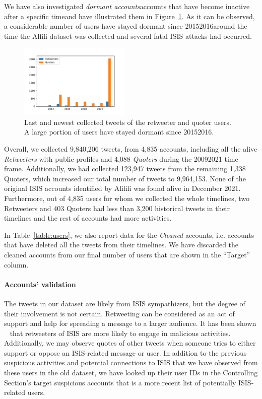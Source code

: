 \documentclass[letterpaper]{article} %
\begin{document}
We have also investigated \textit{dormant accounts}accounts that have become inactive after a specific timeand have illustrated them in Figure~\ref{fig:last-activity}. As it can be observed, a considerable  number  of  users  have stayed dormant since 20152016around the time the Alfifi dataset was collected and several fatal ISIS attacks had occurred.

\begin{figure}[htbp]
\includegraphics[width=0.47\textwidth]{img/newest-activity.pdf}
\caption{Last and newest collected tweets of the retweeter and quoter users. A large portion of users have stayed dormant since 20152016.}
\label{fig:last-activity}
\end{figure}


Overall, we collected 9,840,206 tweets, from 4,835 accounts, including all the alive \textit{Retweeters} with public profiles and 4,088 \textit{Quoters} during the 20092021 time frame. Additionally, we had collected 123,947 tweets from the remaining 1,338 Quoters, which increased our total number of tweets to 9,964,153. None of the original ISIS accounts identified by Alififi \cite{alfifi2018measuring} was found alive in December 2021. Furthermore, out of 4,835 users for whom we collected the whole timelines, two Retweeters and 403 Quoters had less than 3,200 historical tweets in their timelines and the rest of accounts had more activities.

In Table~\ref{table:users}, we also report data for the {\em Cleaned}  accounts, i.e. accounts  that  have deleted all the tweets from their timelines.  We have discarded the cleaned accounts from our final number of users that are shown in the ``Target'' column.

\paragraph{Accounts' validation} 
 
The tweets in our dataset are likely from ISIS sympathizers, but the degree of their involvement is not certain.
Retweeting can be considered as an act of support and help for spreading a message to a larger audience. It has been shown ~\cite{alfifi2018measuring} that retweeters of ISIS are more likely to engage in malicious activities. Additionally, we may observe quotes of other tweets when someone tries to either support or oppose an ISIS-related message or user. In addition to the previous suspicious activities and potential connections to ISIS that we have observed from these users in the old dataset, we have looked up their user IDs in the Controlling Section's target suspicious accounts that is a more recent list of potentially ISIS-related users. 
\end{document}
